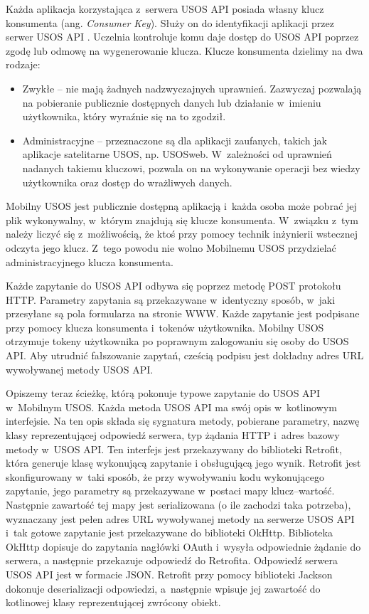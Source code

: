 \documentclass{pracamgr}
\begin{document}
Każda aplikacja korzystająca z~serwera USOS API posiada własny klucz konsumenta
(ang. \textit{Consumer Key}). Służy on do identyfikacji aplikacji przez serwer
USOS API \cite{usosapi-auth}. Uczelnia kontroluje komu daje dostęp do USOS API
poprzez zgodę lub odmowę na wygenerowanie klucza. Klucze konsumenta dzielimy na
dwa rodzaje:
\begin{itemize}
	\item Zwykłe -- nie mają żadnych nadzwyczajnych uprawnień. Zazwyczaj
	pozwalają na pobieranie publicznie dostępnych danych lub działanie w~imieniu
	użytkownika, który wyraźnie się na to zgodził.
	\item Administracyjne -- przeznaczone są dla aplikacji zaufanych, takich jak
	aplikacje satelitarne USOS, np. USOSweb. W~zależności od uprawnień nadanych
	takiemu kluczowi, pozwala on na wykonywanie operacji bez wiedzy użytkownika
	oraz dostęp do wrażliwych danych.
\end{itemize}
Mobilny USOS jest publicznie dostępną aplikacją i~każda osoba może pobrać jej
plik wykonywalny, w~którym znajdują się klucze konsumenta. W~związku z~tym należy
liczyć się z~możliwością, że ktoś przy pomocy technik inżynierii wstecznej odczyta
jego klucz. Z~tego powodu nie wolno Mobilnemu USOS przydzielać administracyjnego
klucza konsumenta.

Każde zapytanie do USOS API odbywa się poprzez metodę POST protokołu HTTP.
Parametry zapytania są przekazywane w~identyczny sposób, w~jaki przesyłane są
pola formularza na stronie WWW. Każde zapytanie jest podpisane przy pomocy klucza
konsumenta i~tokenów użytkownika. Mobilny USOS otrzymuje tokeny użytkownika po
poprawnym zalogowaniu się osoby do USOS API. Aby utrudnić fałszowanie zapytań,
cześcią podpisu jest dokładny adres URL wywoływanej metody USOS API.

Opiszemy teraz ścieżkę, którą pokonuje typowe zapytanie do USOS API w~Mobilnym USOS.
Każda metoda USOS API ma swój opis w~kotlinowym interfejsie. Na ten opis składa
się sygnatura metody, pobierane parametry, nazwę klasy reprezentującej odpowiedź
serwera, typ żądania HTTP i~adres bazowy metody w~USOS API. Ten interfejs jest
przekazywany do biblioteki Retrofit, która generuje klasę wykonującą zapytanie i
obsługującą jego wynik. Retrofit jest skonfigurowany w~taki sposób, że przy
wywoływaniu kodu wykonującego zapytanie, jego parametry są przekazywane w~postaci
mapy klucz--wartość. Następnie zawartość tej mapy jest serializowana (o ile zachodzi
taka potrzeba), wyznaczany jest pełen adres URL wywoływanej metody na serwerze USOS
API i~tak gotowe zapytanie jest przekazywane do biblioteki OkHttp. Biblioteka
OkHttp dopisuje do zapytania nagłówki OAuth i~wysyła odpowiednie żądanie do serwera,
a następnie przekazuje odpowiedź do Retrofita. Odpowiedź serwera USOS API jest w
formacie JSON. Retrofit przy pomocy biblioteki Jackson dokonuje deserializacji
odpowiedzi, a~następnie wpisuje jej zawartość do kotlinowej klasy reprezentującej
zwrócony obiekt.
\end{document}
